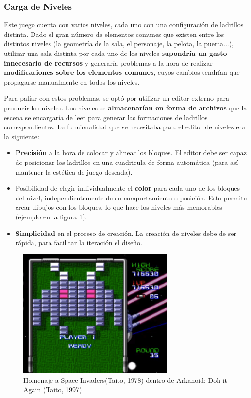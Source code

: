 \subsubsection{Carga de Niveles}
\label{level_generator}
Este juego cuenta con varios niveles, cada uno con una configuración de ladrillos distinta. Dado el gran número de elementos comunes que existen entre los distintos niveles (la geometría de la sala, el personaje, la pelota, la puerta...), utilizar una sala distinta por cada uno de los niveles \textbf{supondría un gasto innecesario de recursos} y generaría problemas a la hora de realizar \textbf{modificaciones sobre los elementos comunes}, cuyos cambios tendrían que propagarse manualmente en todos los niveles.

Para paliar con estos problemas, se optó por utilizar un editor externo para producir los niveles. Los niveles se \textbf{almacenarían en forma de archivos} que la escena se encargaría de leer para generar las formaciones de ladrillos correspondientes. La funcionalidad que se necesitaba para el editor de niveles era la siguiente:
\begin{itemize}
  \item \textbf{Precisión} a la hora de colocar y alinear los bloques. El editor debe ser capaz de posicionar los ladrillos en una cuadricula de forma automática (para así mantener la estética de juego deseada).
  \item Posibilidad de elegir individualmente el \textbf{color} para cada uno de los bloques del nivel, independientemente de su comportamiento o posición. Esto permite crear dibujos con los bloques, lo que hace los niveles más memorables (ejemplo en la figura \ref{ejemplo-arkanoid}). 
  \item \textbf{Simplicidad} en el proceso de creación. La creación de niveles debe de ser rápida, para facilitar la iteración el diseño.
\end{itemize}

\begin{figure}[h]
	\includegraphics[width=0.7\textwidth]{images/estructura/niveles/ejemplo-arkanoid}
	\centering
	\caption{Homenaje a Space Invaders(Taito, 1978) dentro de Arkanoid: Doh it Again (Taito, 1997)}
	\label{ejemplo-arkanoid}
\end{figure}

